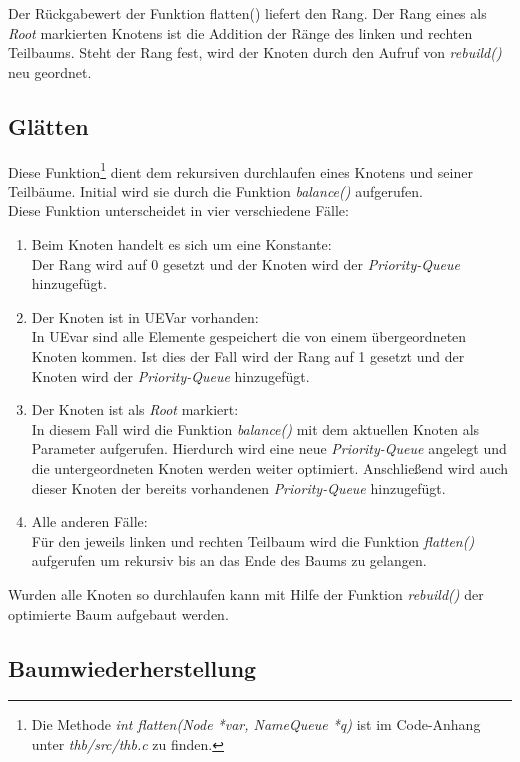 Der Rückgabewert der Funktion flatten() liefert den Rang. Der Rang eines als \textit{Root} markierten Knotens ist die Addition der Ränge des linken und rechten Teilbaums. Steht der Rang fest, wird der Knoten durch den Aufruf von \textit{rebuild()} neu geordnet.

\subsection{Glätten}
Diese Funktion\footnote{Die Methode \textit{int flatten(Node *var, NameQueue *q)} ist im Code-Anhang unter \textit{thb/src/thb.c} zu finden.} dient dem rekursiven durchlaufen eines Knotens und seiner Teilbäume. Initial wird sie durch die Funktion \textit{balance()} aufgerufen.\\

Diese Funktion unterscheidet in vier verschiedene Fälle:
\begin{enumerate}
	\item Beim Knoten handelt es sich um eine Konstante:\\
	Der Rang wird auf 0 gesetzt und der Knoten wird der \textit{Priority-Queue} hinzugefügt.
	\item Der Knoten ist in UEVar vorhanden:\\
	In UEvar sind alle Elemente gespeichert die von einem übergeordneten Knoten kommen. Ist dies der Fall wird der Rang auf 1 gesetzt und der Knoten wird der \textit{Priority-Queue} hinzugefügt.
	\item Der Knoten ist als \textit{Root} markiert:\\
	In diesem Fall wird die Funktion \textit{balance()} mit dem aktuellen Knoten als Parameter aufgerufen. Hierdurch wird eine neue \textit{Priority-Queue} angelegt und die untergeordneten Knoten werden weiter optimiert. Anschließend wird auch dieser Knoten der bereits vorhandenen \textit{Priority-Queue} hinzugefügt.
	\item Alle anderen Fälle:\\
	Für den jeweils linken und rechten Teilbaum wird die Funktion \textit{flatten()} aufgerufen um rekursiv bis an das Ende des Baums zu gelangen.
\end{enumerate}

Wurden alle Knoten so durchlaufen kann mit Hilfe der Funktion \textit{rebuild()} der optimierte Baum aufgebaut werden.

\subsection{Baumwiederherstellung}

